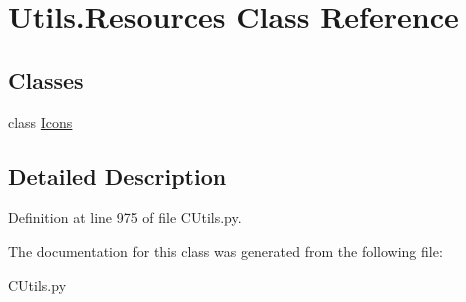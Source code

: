 \hypertarget{class_c_utils_1_1_utils_1_1_resources}{}\section{Utils.\+Resources Class Reference}
\label{class_c_utils_1_1_utils_1_1_resources}
\subsection*{Classes}
\begin{DoxyCompactItemize}
\item 
class \hyperlink{class_c_utils_1_1_utils_1_1_resources_1_1_icons}{Icons}
\end{DoxyCompactItemize}


\subsection{Detailed Description}


Definition at line 975 of file C\+Utils.\+py.



The documentation for this class was generated from the following file\+:\begin{DoxyCompactItemize}
\item 
C\+Utils.\+py\end{DoxyCompactItemize}
